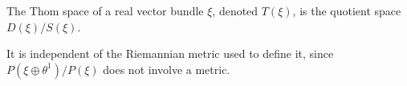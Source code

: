 The Thom space of a real vector bundle $\xi$, denoted $T(\xi)$, is the quotient space $D(\xi)/S(\xi)$.

It is independent of the Riemannian metric used to define it, since $P(\xi \oplus \theta^1)/P(\xi)$ does not involve a metric.
